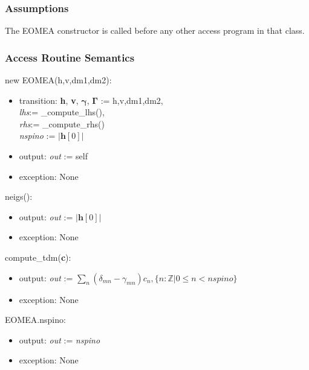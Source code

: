 \documentclass[12pt, titlepage]{article}
\begin{document}
\subsubsection{Assumptions}

The EOMEA constructor is called before any other access program in that class.

\subsubsection{Access Routine Semantics}

\noindent new EOMEA(h,v,dm1,dm2):
\begin{itemize}
	\item transition: \textbf{h}, \textbf{v}, $\boldsymbol{\gamma}$, 
	$\boldsymbol{\Gamma}$ := h,v,dm1,dm2,\\ \textit{lhs}:= \_compute\_lhs(),\\ 
	\textit{rhs}:= \_compute\_rhs()\\
	\textit{nspino} := $|\boldsymbol{h}[0]|$\\
	\item output: \textit{out} := self 
	\item exception: None
\end{itemize}

\noindent neigs():
\begin{itemize}
	\item output: \textit{out} := $|\boldsymbol{h}[0]|$
	\item exception: None
\end{itemize}

\noindent compute\_tdm(\textbf{c}):
\begin{itemize}
	\item output: \textit{out} := $\sum_{n}(\delta_{mn} - \gamma_{mn}) c_n, 
	\{n:\mathbb{Z}|0 \le n < nspino\}$
	\item exception: None
\end{itemize}

\noindent EOMEA.nspino:
\begin{itemize}
	\item output: \textit{out} := \textit{nspino}
	\item exception: None
\end{itemize}
\end{document}
